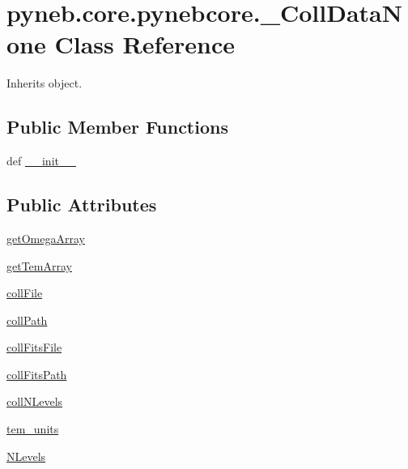 \hypertarget{classpyneb_1_1core_1_1pynebcore_1_1___coll_data_none}{\section{pyneb.\-core.\-pynebcore.\-\_\-\-Coll\-Data\-None Class Reference}
\label{classpyneb_1_1core_1_1pynebcore_1_1___coll_data_none}
}


Inherits object.

\subsection*{Public Member Functions}
\begin{DoxyCompactItemize}
\item 
def \hyperlink{classpyneb_1_1core_1_1pynebcore_1_1___coll_data_none_a251bc227ca525ce64f620c6b86b43ca1}{\-\_\-\-\_\-init\-\_\-\-\_\-}
\end{DoxyCompactItemize}
\subsection*{Public Attributes}
\begin{DoxyCompactItemize}
\item 
\hyperlink{classpyneb_1_1core_1_1pynebcore_1_1___coll_data_none_a9945656d527d539b02443f1e12175952}{get\-Omega\-Array}
\item 
\hyperlink{classpyneb_1_1core_1_1pynebcore_1_1___coll_data_none_a75bd94e0404dbdad86ce0cd849331b6d}{get\-Tem\-Array}
\item 
\hyperlink{classpyneb_1_1core_1_1pynebcore_1_1___coll_data_none_a921566608d3f514d075992b0c6870952}{coll\-File}
\item 
\hyperlink{classpyneb_1_1core_1_1pynebcore_1_1___coll_data_none_a3e39b0e757b0987e39ad0257a981ff13}{coll\-Path}
\item 
\hyperlink{classpyneb_1_1core_1_1pynebcore_1_1___coll_data_none_acb2dc662b7ca086e2d3322b79993fc60}{coll\-Fits\-File}
\item 
\hyperlink{classpyneb_1_1core_1_1pynebcore_1_1___coll_data_none_ad3bac87fe373ebf85361cc6c86b25c97}{coll\-Fits\-Path}
\item 
\hyperlink{classpyneb_1_1core_1_1pynebcore_1_1___coll_data_none_aa6cfd6d6afa856ba4c102acc9180df42}{coll\-N\-Levels}
\item 
\hyperlink{classpyneb_1_1core_1_1pynebcore_1_1___coll_data_none_afc8b4905545401491edcb56c8f0b556e}{tem\-\_\-units}
\item 
\hyperlink{classpyneb_1_1core_1_1pynebcore_1_1___coll_data_none_a194d717f8c873199de6a3e0cb7d7a96b}{N\-Levels}
\end{DoxyCompactItemize}


